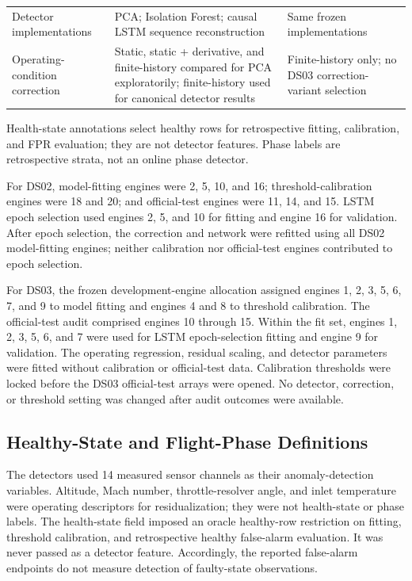 \documentclass[preprint,12pt]{elsarticle}
\begin{document}
\begin{table}[!htbp]
\begin{tabular}{>{\raggedright\arraybackslash}p{}>{\raggedright\arraybackslash}p{}>{\raggedright\arraybackslash}p{}}
Detector implementations & PCA; Isolation Forest; causal LSTM sequence reconstruction & Same frozen implementations \\
Operating-condition correction & Static, static + derivative, and finite-history compared for PCA exploratorily; finite-history used for canonical detector results & Finite-history only; no DS03 correction-variant selection \\
\hline
\end{tabular}
\par\vspace{3pt}\footnotesize Health-state annotations select healthy rows for retrospective fitting, calibration, and FPR evaluation; they are not detector features. Phase labels are retrospective strata, not an online phase detector.
\end{table}



For DS02, model-fitting engines were 2, 5, 10, and 16; threshold-calibration engines were 18 and 20; and official-test engines were 11, 14, and 15. LSTM epoch selection used engines 2, 5, and 10 for fitting and engine 16 for validation. After epoch selection, the correction and network were refitted using all DS02 model-fitting engines; neither calibration nor official-test engines contributed to epoch selection.

For DS03, the frozen development-engine allocation assigned engines 1, 2, 3, 5, 6, 7, and 9 to model fitting and engines 4 and 8 to threshold calibration. The official-test audit comprised engines 10 through 15. Within the fit set, engines 1, 2, 3, 5, 6, and 7 were used for LSTM epoch-selection fitting and engine 9 for validation. The operating regression, residual scaling, and detector parameters were fitted without calibration or official-test data. Calibration thresholds were locked before the DS03 official-test arrays were opened. No detector, correction, or threshold setting was changed after audit outcomes were available.

\subsection{Healthy-State and Flight-Phase Definitions}\label{healthy-state-and-flight-phase-definitions}

The detectors used 14 measured sensor channels as their anomaly-detection variables. Altitude, Mach number, throttle-resolver angle, and inlet temperature were operating descriptors for residualization; they were not health-state or phase labels. The health-state field imposed an oracle healthy-row restriction on fitting, threshold calibration, and retrospective healthy false-alarm evaluation. It was never passed as a detector feature. Accordingly, the reported false-alarm endpoints do not measure detection of faulty-state observations.
\end{document}
